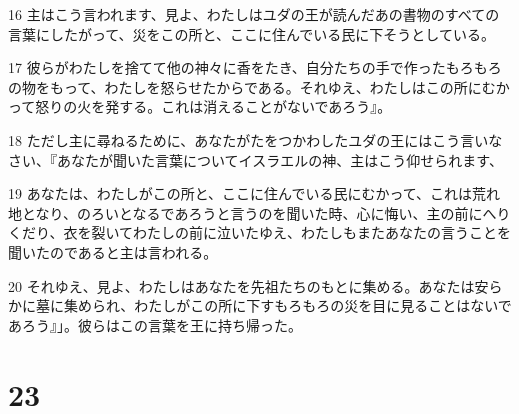 \par 16 主はこう言われます、見よ、わたしはユダの王が読んだあの書物のすべての言葉にしたがって、災をこの所と、ここに住んでいる民に下そうとしている。
\par 17 彼らがわたしを捨てて他の神々に香をたき、自分たちの手で作ったもろもろの物をもって、わたしを怒らせたからである。それゆえ、わたしはこの所にむかって怒りの火を発する。これは消えることがないであろう』。
\par 18 ただし主に尋ねるために、あなたがたをつかわしたユダの王にはこう言いなさい、『あなたが聞いた言葉についてイスラエルの神、主はこう仰せられます、
\par 19 あなたは、わたしがこの所と、ここに住んでいる民にむかって、これは荒れ地となり、のろいとなるであろうと言うのを聞いた時、心に悔い、主の前にへりくだり、衣を裂いてわたしの前に泣いたゆえ、わたしもまたあなたの言うことを聞いたのであると主は言われる。
\par 20 それゆえ、見よ、わたしはあなたを先祖たちのもとに集める。あなたは安らかに墓に集められ、わたしがこの所に下すもろもろの災を目に見ることはないであろう』」。彼らはこの言葉を王に持ち帰った。

\chapter{23}

